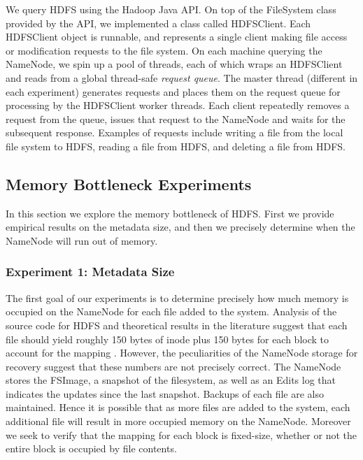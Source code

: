 \documentclass[11pt, a4paper]{article}
\begin{document}
\begin{multicols*}{2}
We query HDFS using the Hadoop Java API. On top of the FileSystem class provided by the API, we implemented a class called HDFSClient. Each HDFSClient object is runnable, and represents a single client making file access or modification requests to the file system. On each machine querying the NameNode, we spin up a pool of threads, each of which wraps an HDFSClient and reads from a global thread-safe \textit{request queue}. The master thread (different in each experiment) generates requests and places them on the request queue for processing by the HDFSClient worker threads. Each client repeatedly removes a request from the queue, issues that request to the NameNode and waits for the subsequent response. Examples of requests include writing a file from the local file system to HDFS, reading a file from HDFS, and deleting a file from HDFS.

\subsection{Memory Bottleneck Experiments}
In this section we explore the memory bottleneck of HDFS. First we provide empirical results on the metadata size, and then we precisely determine when the NameNode will run out of memory.
\subsubsection{Experiment 1: Metadata Size}\label{MetadataSize}
The first goal of our experiments is to determine precisely how much memory is occupied on the NameNode for each file added to the system. Analysis of the source code for HDFS and theoretical results in the literature suggest that each file should yield roughly 150 bytes of inode plus 150 bytes for each block to account for the mapping \cite{HdfsArch, HdfsScale}. However, the peculiarities of the NameNode storage for recovery suggest that these numbers are not precisely correct. The NameNode stores the FSImage, a snapshot of the filesystem, as well as an Edits log that indicates the updates since the last snapshot. Backups of each file are also maintained. Hence it is possible that as more files are added to the system, each additional file will result in more occupied memory on the NameNode. Moreover we seek to verify that the mapping for each block is fixed-size, whether or not the entire block is occupied by file contents.


\end{multicols*}
\end{document}
